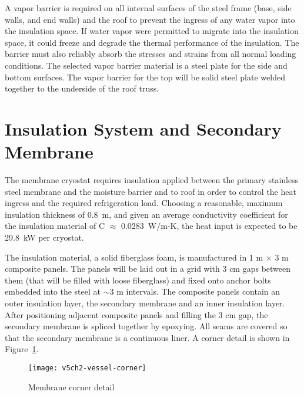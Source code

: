 A vapor barrier is required on all internal surfaces of the 
steel frame (base, side walls, and end walls) and the roof to 
prevent the ingress of any water vapor into the insulation 
space. If water vapor were permitted to migrate into the 
insulation space, it could freeze and degrade the thermal 
performance of the insulation. The barrier must also 
reliably absorb the stresses and strains from all normal 
loading conditions. The selected vapor barrier material 
is a steel plate for the side and bottom surfaces. 
The vapor barrier for the top will be solid steel plate 
welded together to the underside of the roof truss.


\section{Insulation System and Secondary Membrane}
\label{subsec:insul-2nd-mem}

The membrane cryostat requires insulation applied between the primary stainless steel membrane and the moisture barrier and to roof in order to control the heat 
ingress and the required 
refrigeration load. Choosing a reasonable, maximum insulation 
thickness of 0.8~m, and given an average conductivity coefficient 
for the insulation material of C $\approx$ 0.0283~W/m-K, the 
heat input is expected to be 29.8~kW 
per cryostat. %



The insulation material, a solid fiberglass foam, is manufactured in 1 m 
$\times$ 3 m composite panels. The panels will be laid out in a grid with 
3 cm gaps between them (that will be filled with loose fiberglass) and 
fixed onto anchor bolts embedded into the steel at $\sim$3 m intervals. 
The composite panels contain an outer insulation layer, the secondary 
membrane and an inner insulation layer. After positioning adjacent 
composite panels and filling the 3 cm gap, the secondary membrane 
is spliced together by epoxying. All seams are covered so that the secondary
membrane is a continuous liner. A corner detail is shown 
in Figure~\ref{fig:vessel-corner}.


\begin{figure}[htbp]
\centering
\texttt{[image: v5ch2-vessel-corner]}
\caption{Membrane corner detail}
\label{fig:vessel-corner} %
\end{figure}

